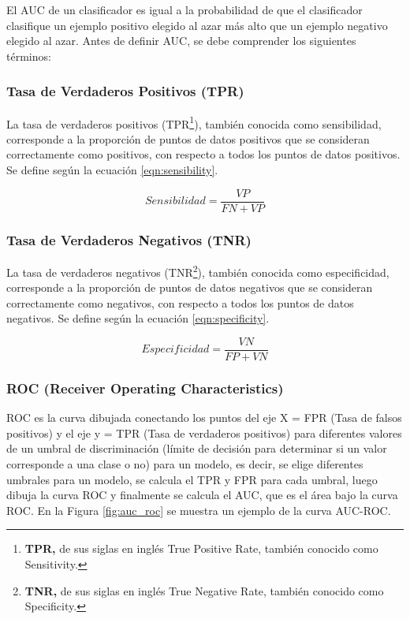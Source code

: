 \vspace{5mm} %

El AUC de un clasificador es igual a la probabilidad de que el clasificador clasifique un ejemplo positivo elegido al azar m\'{a}s alto que un ejemplo negativo elegido al azar. Antes de definir AUC, se debe comprender los siguientes t\'{e}rminos:

\subsubsection{Tasa de Verdaderos Positivos (TPR)}

La tasa de verdaderos positivos (TPR\footnote{\textbf{TPR, }de sus siglas en ingl\'{e}s True Positive Rate, tambi\'{e}n conocido como Sensitivity.}), tambi\'{e}n conocida como sensibilidad, corresponde a la proporción de puntos de datos positivos que se consideran correctamente como positivos, con respecto a todos los puntos de datos positivos. Se define seg\'{u}n la ecuaci\'{o}n \ref{eqn:sensibility}.

\begin{equation}
Sensibilidad = \frac{VP}{FN+VP}
\label{eqn:sensibility}
\end{equation}

\subsubsection{Tasa de Verdaderos Negativos (TNR) }

La tasa de verdaderos negativos (TNR\footnote{\textbf{TNR, }de sus siglas en ingl\'{e}s True Negative Rate, tambi\'{e}n conocido como Specificity.}), tambi\'{e}n conocida como especificidad, corresponde a la proporción de puntos de datos negativos que se consideran correctamente como negativos, con respecto a todos los puntos de datos negativos. Se define seg\'{u}n la ecuaci\'{o}n \ref{eqn:specificity}.

\begin{equation}
Especificidad = \frac{VN}{FP+VN}
\label{eqn:specificity}
\end{equation}

\subsubsection{ROC (Receiver Operating Characteristics)}

ROC es la curva dibujada conectando los puntos del eje X = FPR (Tasa de falsos positivos) y el eje y = TPR (Tasa de verdaderos positivos) para diferentes valores de un umbral de discriminaci\'{o}n (l\'{i}mite de decisi\'{o}n para determinar si un valor corresponde a una clase o no) para un modelo, es decir, se elige diferentes umbrales para un modelo, se calcula el TPR y FPR para cada umbral, luego dibuja la curva ROC y finalmente se calcula el AUC, que es el \'{a}rea bajo la curva ROC. En la Figura \ref{fig:auc_roc} se muestra un ejemplo de la curva AUC-ROC.

